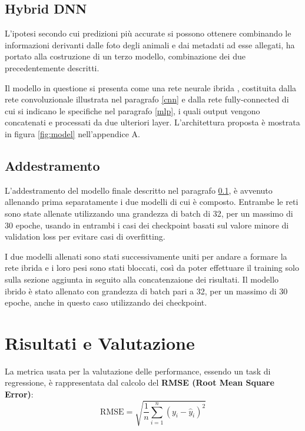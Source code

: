     \subsection{Hybrid DNN}
    \label{mulinput}
    L'ipotesi secondo cui predizioni più accurate si possono ottenere combinando le informazioni derivanti dalle foto degli animali e dai metadati ad esse allegati, ha portato alla
    costruzione di un terzo modello, combinazione dei due precedentemente descritti.

    Il modello in questione si presenta come una rete neurale ibrida \cite{yuan2020hybriddnns}, costituita dalla rete convoluzionale illustrata nel paragrafo \ref{cnn} e dalla rete fully-connected di cui si indicano le specifiche nel paragrafo \ref{mlp}, i quali output vengono concatenati e processati da due ulteriori layer.
    L'architettura proposta è mostrata in figura \ref{fig:model} nell'appendice A.


    \subsection{Addestramento}
    L'addestramento del modello finale descritto nel paragrafo \ref{mulinput}, è avvenuto allenando prima separatamente i due modelli di cui è composto. Entrambe le reti sono state allenate utilizzando una grandezza di batch di 32, per un massimo di 30 epoche, usando in entrambi i casi dei checkpoint basati sul valore minore di validation loss per evitare casi di overfitting. 

    I due modelli allenati sono stati successivamente uniti per andare a formare la rete ibrida e i loro pesi sono stati bloccati, così da poter effettuare il training 
    solo sulla sezione aggiunta in seguito alla concatenzaione dei risultati.
    Il modello ibrido è stato allenato con grandezza di batch pari a 32, per un massimo di 30 epoche, anche in questo caso utilizzando dei checkpoint.


\section{Risultati e Valutazione}

La metrica usata per la valutazione delle performance, essendo un task di regressione, è rappresentata dal calcolo del \textbf{RMSE (Root Mean Square Error)}:
\begin{equation}
    \textrm{RMSE} = \sqrt{\frac{1}{n} \sum_{i=1}^{n} (y_i - \hat{y}_i)^2} 
\end{equation}

